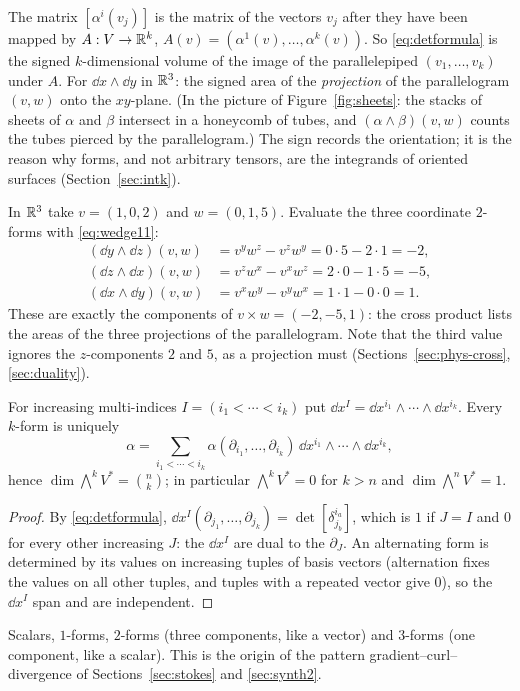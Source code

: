 \begin{intuition}
The matrix $[\alpha^i(v_j)]$ is the matrix of the vectors $v_j$ after they have been mapped by
$A:V\to\mathbb{R}^k$, $A(v)=(\alpha^1(v),\dots,\alpha^k(v))$. So \eqref{eq:detformula} is the signed $k$-dimensional volume of the image
of the parallelepiped $(v_1,\dots,v_k)$ under $A$. For $\dd x\wedge\dd y$ in $\mathbb{R}^3$: the signed area of the \emph{projection} of
the parallelogram $(v,w)$ onto the $xy$-plane. (In the picture of Figure~\ref{fig:sheets}: the stacks of sheets of $\alpha$ and
$\beta$ intersect in a honeycomb of tubes, and $(\alpha\wedge\beta)(v,w)$ counts the tubes pierced by the parallelogram.)
The sign records the orientation; it is the reason why forms, and not arbitrary tensors, are the integrands of oriented surfaces
(Section~\ref{sec:intk}).
\end{intuition}

\begin{example}\label{ex:projareas}
In $\mathbb{R}^3$ take $v=(1,0,2)$ and $w=(0,1,5)$. Evaluate the three coordinate $2$-forms with \eqref{eq:wedge11}:
\begin{align*}
(\dd y\wedge\dd z)(v,w)&=v^yw^z-v^zw^y=0\cdot5-2\cdot1=-2,\\
(\dd z\wedge\dd x)(v,w)&=v^zw^x-v^xw^z=2\cdot0-1\cdot5=-5,\\
(\dd x\wedge\dd y)(v,w)&=v^xw^y-v^yw^x=1\cdot1-0\cdot0=1.
\end{align*}
These are exactly the components of $v\times w=(-2,-5,1)$: the cross product lists the areas of the three projections of the
parallelogram. Note that the third value ignores the $z$-components $2$ and $5$, as a projection must
(Sections~\ref{sec:phys-cross}, \ref{sec:duality}).
\end{example}

\begin{proposition}\label{prop:formbasis}
For increasing multi-indices $I=(i_1<\cdots<i_k)$ put $\dd x^I=\dd x^{i_1}\wedge\cdots\wedge\dd x^{i_k}$. Every $k$-form is uniquely
\[
\alpha=\sum_{i_1<\cdots<i_k}\alpha(\partial_{i_1},\dots,\partial_{i_k})\,\dd x^{i_1}\wedge\cdots\wedge\dd x^{i_k},
\]
hence $\dim\bigwedge^kV^*=\binom nk$; in particular $\bigwedge^kV^*=0$ for $k>n$ and $\dim\bigwedge^nV^*=1$.
\end{proposition}
\begin{proof}
By \eqref{eq:detformula}, $\dd x^I(\partial_{j_1},\dots,\partial_{j_k})=\det[\delta^{i_a}_{j_b}]$, which is $1$ if $J=I$ and $0$ for every
other increasing $J$: the $\dd x^I$ are dual to the $\partial_J$. An alternating form is determined by its values on increasing
tuples of basis vectors (alternation fixes the values on all other tuples, and tuples with a repeated vector give $0$), so the
$\dd x^I$ span and are independent.
\end{proof}

\begin{specialcase}[$n=3$: dimensions $1,3,3,1$]
Scalars, $1$-forms, $2$-forms (three components, like a vector) and $3$-forms (one component, like a scalar). This is the origin of
the pattern gradient--curl--divergence of Sections~\ref{sec:stokes} and \ref{sec:synth2}.
\end{specialcase}
